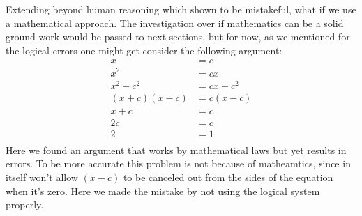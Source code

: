 \documentclass[10pt,a4paper]{article}
\begin{document}
                Extending beyond human reasoning which shown to be mistakeful, what if we use a mathematical approach. The investigation over if mathematics can be a solid ground work would be passed to next sections, but for now, as we mentioned for the logical errors one might get consider the following argument:
                \begin{align*}
                    x &=c \\
                    x^2 &= cx\\
                    x^2 - c^2 &= cx - c^2\\
                    (x+c)(x-c) &= c(x-c)\\
                    x + c &= c \\
                    2c &= c \\ 
                    2 &=1 \\ 
                \end{align*}
                Here we found an argument that works by mathematical laws but yet results in errors. To be more accurate this problem is not because of matheamtics, since in itself won't allow $(x-c)$ to be canceled out from the sides of the equation when it's zero. Here we made the mistake by not using the logical system properly. \cite{CW/E}
                \\
                \\
\end{document}
